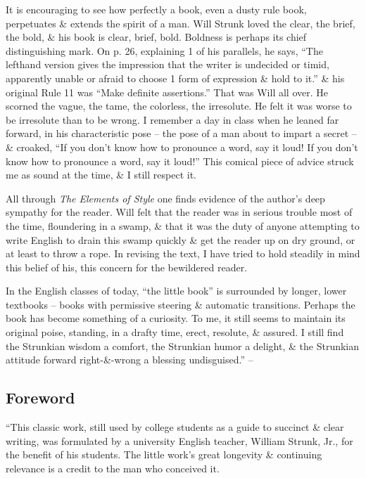 \documentclass{article}
\begin{document}
It is encouraging to see how perfectly a book, even a dusty rule book, perpetuates \& extends the spirit of a man. Will Strunk loved the clear, the brief, the bold, \& his book is clear, brief, bold. Boldness is perhaps its chief distinguishing mark. On p. 26, explaining 1 of his parallels, he says, ``The lefthand version gives the impression that the writer is undecided or timid, apparently unable or afraid to choose 1 form of expression \& hold to it.'' \& his original Rule 11 was ``Make definite assertions.'' That was Will all over. He scorned the vague, the tame, the colorless, the irresolute. He felt it was worse to be irresolute than to be wrong. I remember a day in class when he leaned far forward, in his characteristic pose -- the pose of a man about to impart a secret -- \& croaked, ``If you don't know how to pronounce a word, say it loud! If you don't know how to pronounce a word, say it loud!'' This comical piece of advice struck me as sound at the time, \& I still respect it. 

All through {\it The Elements of Style} one finds evidence of the author's deep sympathy for the reader. Will felt that the reader was in serious trouble most of the time, floundering in a swamp, \& that it was the duty of anyone attempting to write English to drain this swamp quickly \& get the reader up on dry ground, or at least to throw a rope. In revising the text, I have tried to hold steadily in mind this belief of his, this concern for the bewildered reader.

In the English classes of today, ``the little book'' is surrounded by longer, lower textbooks -- books with permissive steering \& automatic transitions. Perhaps the book has become something of a curiosity. To me, it still seems to maintain its original poise, standing, in a drafty time, erect, resolute, \& assured. I still find the Strunkian wisdom a comfort, the Strunkian humor a delight, \& the Strunkian attitude forward right-\&-wrong a blessing undisguised.'' -- \cite[Introduction (by E. B. White)]{Strunk_White_element_style}


\subsection*{Foreword}
``This classic work, still used by college students as a guide to succinct \& clear writing, was formulated by a university English teacher, {\sc William Strunk, Jr.}, for the benefit of his students. The little work's great longevity \& continuing relevance is a credit to the man who conceived it.
\end{document}
